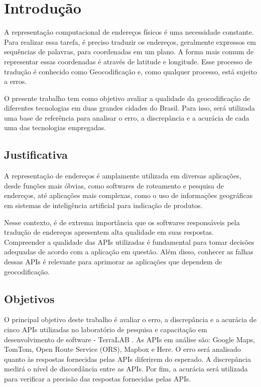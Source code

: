 \chapter{Introdução} \label{Introducao}

A representação computacional de endereços físicos é uma necessidade constante. Para realizar essa tarefa, é preciso traduzir os endereços, geralmente expressos em sequências de palavras, para coordenadas em um plano. A forma mais comum de representar essas coordenadas é através de latitude e longitude. Esse processo de tradução é conhecido como Geocodificação e, como qualquer processo, está sujeito a erros.

O presente trabalho tem como objetivo avaliar a qualidade da geocodificação de diferentes tecnologias em duas grandes cidades do Brasil. Para isso, será utilizada uma base de referência para analisar o erro, a discrepância e a acurácia de cada uma das tecnologias empregadas.

\section{Justificativa}

A representação de endereços é amplamente utilizada em diversas aplicações, desde funções mais óbvias, como softwares de roteamento e pesquisa de endereços, até aplicações mais complexas, como o uso de informações geográficas em sistemas de inteligência artificial para indicação de produtos.

Nesse contexto, é de extrema importância que os softwares responsáveis pela tradução de endereços apresentem alta qualidade em suas respostas. Compreender a qualidade das APIs utilizadas é fundamental para tomar decisões adequadas de acordo com a aplicação em questão. Além disso, conhecer as falhas dessas APIs é relevante para aprimorar as aplicações que dependem de geocodificação.

\section{Objetivos}

O principal objetivo deste trabalho é avaliar o erro, a discrepância e a acurácia de cinco APIs utilizadas no laboratório de pesquisa e capacitação em desenvolvimento de software - TerraLAB \cite{terralab}. As APIs em análise são: Google Maps, TomTom, Open Route Service (ORS), Mapbox e Here. O erro será analisado quanto às respostas fornecidas pelas APIs diferirem do esperado. A discrepância medirá o nível de discordância entre as APIs. Por fim, a acurácia será utilizada para verificar a precisão das respostas fornecidas pelas APIs.

